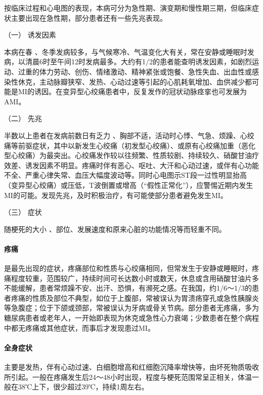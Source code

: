 按临床过程和心电图的表现，本病可分为急性期、演变期和慢性期三期，但临床症状主要出现在急性期，部分患者还有一些先兆表现。

\hypertarget{text00312.htmlux5cux23CHP10-8-2-2-1-1}{}
（一） 诱发因素

本病在春
、冬季发病较多，与气候寒冷、气温变化大有关，常在安静或睡眠时发病，以清晨6时至午间12时发病最多。大约有1/2的患者能查明诱发因素，如剧烈运动、过重的体力劳动、创伤、情绪激动、精神紧张或饱餐、急性失血、出血性或感染性休克，主动脉瓣狭窄、发热、心动过速等引起的心肌耗氧增加、血供减少都可能是MI的诱因。在变异型心绞痛患者中，反复发作的冠状动脉痉挛也可发展为AMI。

\hypertarget{text00312.htmlux5cux23CHP10-8-2-2-1-2}{}
（二） 先兆

半数以上患者在发病前数日有乏力
、胸部不适，活动时心悸、气急、烦躁、心绞痛等前驱症状，其中以新发生心绞痛（初发型心绞痛）、或原有心绞痛加重（恶化型心绞痛）为最突出。心绞痛发作较以往频繁、性质较剧、持续较久、硝酸甘油疗效差、诱发因素不明显。疼痛时伴有恶心、呕吐、大汗和心动过速，或伴有心功能不全、严重心律失常、血压大幅度波动等。同时心电图示ST段一过性明显抬高（变异型心绞痛）或压低，T波倒置或增高（“假性正常化”），应警惕近期内发生MI的可能。发现先兆，及时积极治疗，有可能使部分患者避免发生MI。

\hypertarget{text00312.htmlux5cux23CHP10-8-2-2-1-3}{}
（三） 症状

随梗死的大小 、部位、发展速度和原来心脏的功能情况等而轻重不同。

\paragraph{疼痛}

是最先出现的症状，疼痛部位和性质与心绞痛相同，但常发生于安静或睡眠时，疼痛程度较重，范围较广，持续时间可长达数小时或数天，休息或含用硝酸甘油片多不能缓解，患者常烦躁不安、出汗、恐惧，有濒死之感。在我国，约1/6～1/3的患者疼痛的性质及部位不典型，如位于上腹部，常被误认为胃溃疡穿孔或急性胰腺炎等急腹症；位于下颌或颈部，常被误认为牙病或骨关节病。部分患者无疼痛，多为糖尿病患者或老年人，一开始即表现为休克或急性心力衰竭；少数患者在整个病程中都无疼痛或其他症状，而事后才发现患过MI。

\paragraph{全身症状}

主要是发热，伴有心动过速、白细胞增高和红细胞沉降率增快等，由坏死物质吸收所引起。一般在疼痛发生后24～48小时出现，程度与梗死范围常呈正相关，体温一般在38℃上下，很少超过39℃，持续1周左右。

